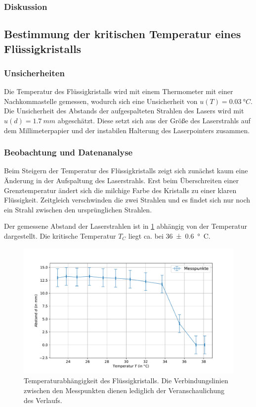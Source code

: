 \documentclass[
	a4paper,
	12pt,
	pagesize,
	ngerman
]{scrartcl}
\begin{document}
	\subsubsection{Diskussion}
	\subsection{Bestimmung der kritischen Temperatur eines Flüssigkristalls} %
	\subsubsection{Unsicherheiten}
	Die Temperatur des Flüssigkristalls wird mit einem Thermometer mit einer Nachkommastelle gemessen, wodurch sich eine Unsicherheit von $u(T)=\SI{0.03}{\degree C}$.
	Die Unsicherheit des Abstands der aufgespalteten Strahlen des Lasers wird mit $u(d)=\SI{1.7}{mm}$ abgeschätzt.
	Diese setzt sich aus der Größe des Laserstrahls auf dem Millimeterpapier und der instabilen Halterung des Laserpointers zusammen.
	\subsubsection{Beobachtung und Datenanalyse}
	Beim Steigern der Temperatur des Flüssigkristalls zeigt sich zunächst kaum eine Änderung in der Aufspaltung des Laserstrahls.
	Erst beim Überschreiten einer Grenztemperatur ändert sich die milchige Farbe des Kristalls zu einer klaren Flüssigkeit.
	Zeitgleich verschwinden die zwei Strahlen und es findet sich nur noch ein Strahl zwischen den ursprünglichen Strahlen.

	Der gemessene Abstand der Laserstrahlen ist in \cref{fig_laser} abhängig von der Temperatur dargestellt.
	Die kritische Temperatur $T_C$ liegt ca. bei \SI{36+-0.6}{\degree C}.
		\begin{figure}[H]
			\includegraphics[width=1\linewidth]{images/laser.pdf}
			\caption{
			Temperaturabhängigkeit des Flüssigkristalls.
			Die Verbindungslinien zwischen den Messpunkten dienen lediglich der Veranschaulichung des Verlaufs.
			}
			\label{fig_laser}
	\end{figure}
\end{document}
